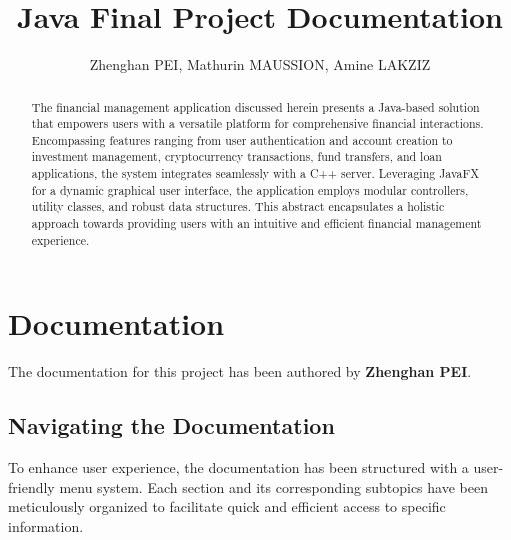 \documentclass{article}
\title{Java Final Project Documentation}
\author{Zhenghan PEI, Mathurin MAUSSION, Amine LAKZIZ}
\begin{document}
\maketitle

\begin{abstract}
The financial management application discussed herein presents a Java-based solution that empowers users with a versatile platform for comprehensive financial interactions. Encompassing features ranging from user authentication and account creation to investment management, cryptocurrency transactions, fund transfers, and loan applications, the system integrates seamlessly with a C++ server. Leveraging JavaFX for a dynamic graphical user interface, the application employs modular controllers, utility classes, and robust data structures. This abstract encapsulates a holistic approach towards providing users with an intuitive and efficient financial management experience.
\end{abstract}

\section*{Documentation}
The documentation for this project has been authored by \textbf{Zhenghan PEI}.

\subsection*{Navigating the Documentation}
To enhance user experience, the documentation has been structured with a user-friendly menu system. Each section and its corresponding subtopics have been meticulously organized to facilitate quick and efficient access to specific information.
\end{document}
